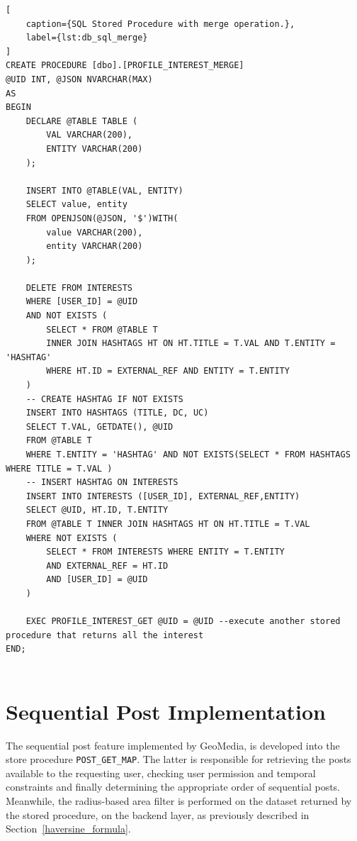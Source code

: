 
\begin{lstlisting}[
    caption={SQL Stored Procedure with merge operation.},
    label={lst:db_sql_merge}
]
CREATE PROCEDURE [dbo].[PROFILE_INTEREST_MERGE]
@UID INT, @JSON NVARCHAR(MAX)
AS
BEGIN
    DECLARE @TABLE TABLE (
        VAL VARCHAR(200),
        ENTITY VARCHAR(200)
    );

    INSERT INTO @TABLE(VAL, ENTITY)
    SELECT value, entity
    FROM OPENJSON(@JSON, '$')WITH(
        value VARCHAR(200),
        entity VARCHAR(200)
    );

    DELETE FROM INTERESTS
    WHERE [USER_ID] = @UID
    AND NOT EXISTS ( 
        SELECT * FROM @TABLE T 
        INNER JOIN HASHTAGS HT ON HT.TITLE = T.VAL AND T.ENTITY = 'HASHTAG'
        WHERE HT.ID = EXTERNAL_REF AND ENTITY = T.ENTITY
    )
    -- CREATE HASHTAG IF NOT EXISTS
    INSERT INTO HASHTAGS (TITLE, DC, UC)
    SELECT T.VAL, GETDATE(), @UID
    FROM @TABLE T
    WHERE T.ENTITY = 'HASHTAG' AND NOT EXISTS(SELECT * FROM HASHTAGS WHERE TITLE = T.VAL )
    -- INSERT HASHTAG ON INTERESTS
    INSERT INTO INTERESTS ([USER_ID], EXTERNAL_REF,ENTITY)
    SELECT @UID, HT.ID, T.ENTITY
    FROM @TABLE T INNER JOIN HASHTAGS HT ON HT.TITLE = T.VAL
    WHERE NOT EXISTS (
        SELECT * FROM INTERESTS WHERE ENTITY = T.ENTITY
        AND EXTERNAL_REF = HT.ID
        AND [USER_ID] = @UID
    )

    EXEC PROFILE_INTEREST_GET @UID = @UID --execute another stored procedure that returns all the interest
END;


\end{lstlisting}


\section{Sequential Post Implementation}

The sequential post feature implemented by GeoMedia, is developed into the store procedure \texttt{POST\_GET\_MAP}. The latter is responsible for retrieving the posts available to the requesting user, checking user permission and temporal constraints and finally determining the appropriate order of sequential posts. 
Meanwhile, the radius-based area filter is performed on the dataset returned by the stored procedure, on the backend layer, as previously described in Section~\ref{haversine_formula}. \\

